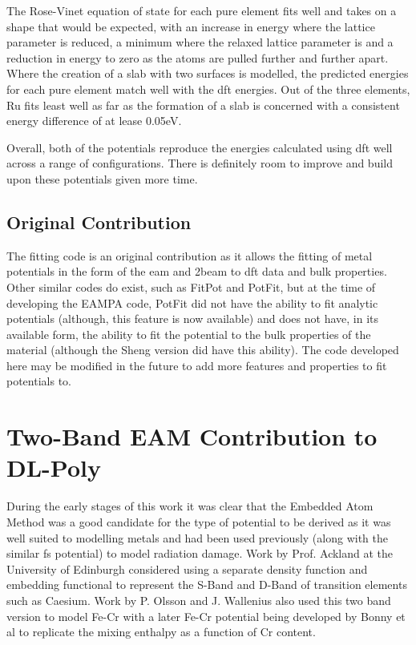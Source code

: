 The Rose-Vinet equation of state for each pure element fits well and takes on a shape that would be expected, with an increase in energy where the lattice parameter is reduced, a minimum where the relaxed lattice parameter is and a reduction in energy to zero as the atoms are pulled further and further apart.  Where the creation of a slab with two surfaces is modelled, the predicted energies for each pure element match well with the \acrshort{dft} energies.  Out of the three elements, Ru fits least well as far as the formation of a slab is concerned with a consistent energy difference of at lease 0.05eV.

Overall, both of the potentials reproduce the energies calculated using \acrshort{dft} well across a range of configurations.  There is definitely room to improve and build upon these potentials given more time.

\subsection{Original Contribution}

The fitting code is an original contribution as it allows the fitting of metal potentials in the form of the \acrlong{eam} and \acrlong{2beam} to \acrshort{dft} data and bulk properties.  Other similar codes do exist, such as FitPot and PotFit, but at the time of developing the EAMPA code, PotFit did not have the ability to fit analytic potentials (although, this feature is now available) and does not have, in its available form, the ability to fit the potential to the bulk properties of the material (although the Sheng version did have this ability).  The code developed here may be modified in the future to add more features and properties to fit potentials to. 



\section{Two-Band EAM Contribution to DL-Poly}

During the early stages of this work it was clear that the Embedded Atom Method was a good candidate for the type of potential to be derived as it was well suited to modelling metals and had been used previously (along with the similar \acrshort{fs} potential) to model radiation damage\cite{damagebcciron}.  Work by Prof. Ackland at the University of Edinburgh considered using a separate density function and embedding functional to represent the S-Band and D-Band of transition elements such as Caesium.  Work by P. Olsson and J. Wallenius also used this two band version to model Fe-Cr with a later Fe-Cr potential being developed by Bonny et al to replicate the mixing enthalpy as a function of Cr content.  

